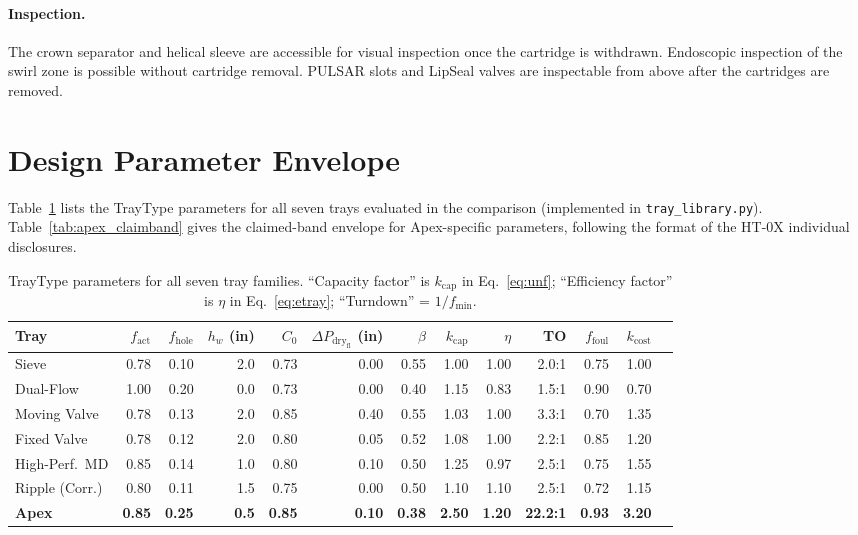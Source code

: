 \documentclass[11pt,letterpaper]{article}
\newcommand{\dpd}{\Delta P_{\mathrm{dry}}}
\begin{document}
\paragraph{Inspection.}
The crown separator and helical sleeve are accessible for visual inspection
once the cartridge is withdrawn.  Endoscopic inspection of the swirl zone is
possible without cartridge removal.  PULSAR slots and LipSeal valves are
inspectable from above after the cartridges are removed.

\section{Design Parameter Envelope}
\label{sec:parameters}

Table~\ref{tab:traytype} lists the TrayType parameters for all seven trays
evaluated in the comparison (implemented in \texttt{tray\_library.py}).
Table~\ref{tab:apex_claimband} gives the claimed-band envelope for
Apex-specific parameters, following the format of the HT-0X individual
disclosures.

\begin{table}[H]
\centering
\caption{TrayType parameters for all seven tray families.  ``Capacity factor''
is $k_{\mathrm{cap}}$ in Eq.~\eqref{eq:unf}; ``Efficiency factor'' is $\eta$
in Eq.~\eqref{eq:etray}; ``Turndown'' = $1/f_{\mathrm{min}}$.}
\label{tab:traytype}
\small
\begin{tabular}{lrrrrrrrrrrrr}
\toprule
Tray & $f_{\mathrm{act}}$ & $f_{\mathrm{hole}}$ & $h_w$ (in) & $C_0$
  & $\dpd_{\mathrm{fl}}$ (in) & $\beta$ & $k_{\mathrm{cap}}$ & $\eta$
  & TO & $f_{\mathrm{foul}}$ & $k_{\mathrm{cost}}$\\
\midrule
Sieve              & 0.78 & 0.10 & 2.0 & 0.73 & 0.00 & 0.55 & 1.00 & 1.00 & 2.0:1  & 0.75 & 1.00\\
Dual-Flow          & 1.00 & 0.20 & 0.0 & 0.73 & 0.00 & 0.40 & 1.15 & 0.83 & 1.5:1  & 0.90 & 0.70\\
Moving Valve       & 0.78 & 0.13 & 2.0 & 0.85 & 0.40 & 0.55 & 1.03 & 1.00 & 3.3:1  & 0.70 & 1.35\\
Fixed Valve        & 0.78 & 0.12 & 2.0 & 0.80 & 0.05 & 0.52 & 1.08 & 1.00 & 2.2:1  & 0.85 & 1.20\\
High-Perf.\ MD     & 0.85 & 0.14 & 1.0 & 0.80 & 0.10 & 0.50 & 1.25 & 0.97 & 2.5:1  & 0.75 & 1.55\\
Ripple (Corr.)     & 0.80 & 0.11 & 1.5 & 0.75 & 0.00 & 0.50 & 1.10 & 1.10 & 2.5:1  & 0.72 & 1.15\\
\textbf{Apex}      & \textbf{0.85} & \textbf{0.25} & \textbf{0.5} & \textbf{0.85}
  & \textbf{0.10} & \textbf{0.38} & \textbf{2.50} & \textbf{1.20} & \textbf{22.2:1}
  & \textbf{0.93} & \textbf{3.20}\\
\bottomrule
\end{tabular}
\end{table}
\end{document}
